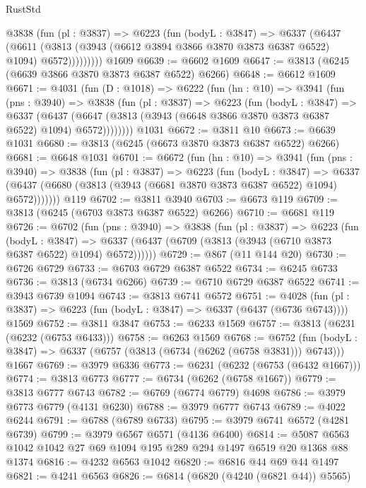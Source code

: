 \begin{lexlean}{RustStd}
\begin{coremodule}
{\begin{coremodule}
{{{{{{{{{{{{{{{{{{{{{{{{{{{{{{{{{{{          @3838
            (fun (pl : @3837) =>
            @6223
              (fun (bodyL : @3847) =>
              @6337
                (@6437
                  (@6611
                    (@3813 (@3943 (@6612 @3894 @3866 @3870 @3873 @6387 @6522) @1094) @6572)))))))))
    @1609
@6639 := @6602 @1609
@6647 := @3813 (@6245 (@6639 @3866 @3870 @3873 @6387 @6522) @6266)
@6648 := @6612 @1609
@6671 := @4031
    (fun (D : @1018) =>
    @6222
      (fun (hn : @10) =>
      @3941
        (fun (pns : @3940) =>
        @3838
          (fun (pl : @3837) =>
          @6223
            (fun (bodyL : @3847) =>
            @6337
              (@6437 (@6647 (@3813 (@3943 (@6648 @3866 @3870 @3873 @6387 @6522) @1094) @6572))))))))
    @1031
@6672 := @3811 @10
@6673 := @6639 @1031
@6680 := @3813 (@6245 (@6673 @3870 @3873 @6387 @6522) @6266)
@6681 := @6648 @1031
@6701 := @6672
    (fun (hn : @10) =>
    @3941
      (fun (pns : @3940) =>
      @3838
        (fun (pl : @3837) =>
        @6223
          (fun (bodyL : @3847) =>
          @6337 (@6437 (@6680 (@3813 (@3943 (@6681 @3870 @3873 @6387 @6522) @1094) @6572)))))))
    @119
@6702 := @3811 @3940
@6703 := @6673 @119
@6709 := @3813 (@6245 (@6703 @3873 @6387 @6522) @6266)
@6710 := @6681 @119
@6726 := @6702
    (fun (pns : @3940) =>
    @3838
      (fun (pl : @3837) =>
      @6223
        (fun (bodyL : @3847) =>
        @6337 (@6437 (@6709 (@3813 (@3943 (@6710 @3873 @6387 @6522) @1094) @6572))))))
@6729 := @867 (@11 @144 @20)
@6730 := @6726 @6729
@6733 := @6703 @6729 @6387 @6522
@6734 := @6245 @6733
@6736 := @3813 (@6734 @6266)
@6739 := @6710 @6729 @6387 @6522
@6741 := @3943 @6739 @1094
@6743 := @3813 @6741 @6572
@6751 := @4028
    (fun (pl : @3837) => @6223 (fun (bodyL : @3847) => @6337 (@6437 (@6736 @6743))))
    @1569
@6752 := @3811 @3847
@6753 := @6233 @1569
@6757 := @3813 (@6231 (@6232 (@6753 @6433)))
@6758 := @6263 @1569
@6768 := @6752
    (fun (bodyL : @3847) => @6337 (@6757 (@3813 (@6734 (@6262 (@6758 @3831))) @6743)))
    @1667
@6769 := @3979 @6336
@6773 := @6231 (@6232 (@6753 (@6432 @1667)))
@6774 := @3813 @6773
@6777 := @6734 (@6262 (@6758 @1667))
@6779 := @3813 @6777 @6743
@6782 := @6769 (@6774 @6779) @4698
@6786 := @3979 @6773 @6779 (@4131 @6230)
@6788 := @3979 @6777 @6743
@6789 := @4022 @6244
@6791 := @6788 (@6789 @6733)
@6795 := @3979 @6741 @6572 (@4281 @6739)
@6799 := @3979 @6567 @6571 (@4136 @6400)
@6814 := @5087 @6563 @1042 @1042 @27 @69 @1094 @195 @289 @294 @1497 @6519 @20 @1368 @88 @1374
@6816 := @4232 @6563 @1042
@6820 := @6816 @44 @69 @44 @1497
@6821 := @4241 @6563
@6826 := @6814 (@6820 (@4240 (@6821 @44)) @5565)
}}}}}}}}}}}}}}}}}}}}}}}}}}}}}}}}}}}
\end{coremodule}}
\end{coremodule}
\end{lexlean}
